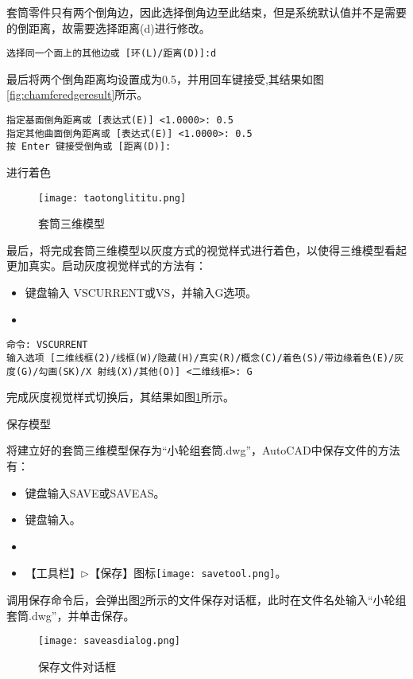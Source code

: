 \begin{procedure}
套筒零件只有两个倒角边，因此选择倒角边至此结束，但是系统默认值并不是需要的倒距离，故需要选择距离(d)进行修改。
\begin{lstlisting}
选择同一个面上的其他边或 [环(L)/距离(D)]:d
\end{lstlisting}

最后将两个倒角距离均设置成为0.5，并用回车键接受,其结果如图\ref{fig:chamferedgeresult}所示。
\begin{lstlisting}
指定基面倒角距离或 [表达式(E)] <1.0000>: 0.5
指定其他曲面倒角距离或 [表达式(E)] <1.0000>: 0.5
按 Enter 键接受倒角或 [距离(D)]:
\end{lstlisting}
\item 进行着色
\begin{figure}[htbp]
\centering
\texttt{[image: taotonglititu.png]}
\caption{套筒三维模型}\label{fig:taotonglititu}
\end{figure}

最后，将完成套筒三维模型以灰度方式的视觉样式进行着色，以使得三维模型看起更加真实。启动灰度视觉样式的方法有：
\begin{itemize}
\item 键盘输入 VSCURRENT或VS，并输入G选项。
\item {}
\end{itemize}
\begin{lstlisting}
命令: VSCURRENT
输入选项 [二维线框(2)/线框(W)/隐藏(H)/真实(R)/概念(C)/着色(S)/带边缘着色(E)/灰度(G)/勾画(SK)/X 射线(X)/其他(O)] <二维线框>: G
\end{lstlisting}

完成灰度视觉样式切换后，其结果如图\ref{fig:taotonglititu}所示。

\item 保存模型

将建立好的套筒三维模型保存为“小轮组套筒.dwg”，AutoCAD中保存文件的方法有：
\begin{itemize}
\item 键盘输入SAVE或SAVEAS。
\item 键盘输入。
\item {}
\item 【工具栏】$\triangleright$【保存】图标\texttt{[image: savetool.png]}。
\end{itemize}

调用保存命令后，会弹出图\ref{fig:saveasdialog}所示的文件保存对话框，此时在文件名处输入“小轮组套筒.dwg”，并单击保存。
\begin{figure}[htbp]
\centering
\texttt{[image: saveasdialog.png]}
\caption{保存文件对话框}\label{fig:saveasdialog}
\end{figure}
\end{procedure}

\endinput